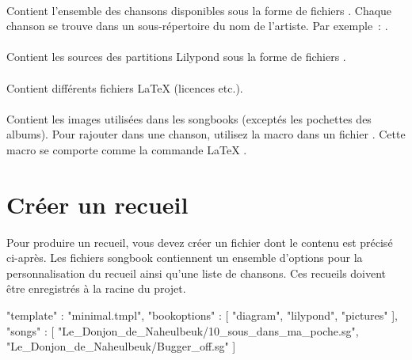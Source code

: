\paragraph{}
Contient l'ensemble des chansons disponibles sous la forme de fichiers
. Chaque chanson se trouve dans un sous-répertoire du nom
de l'artiste. Par exemple~:
.

\paragraph{}
Contient les sources des partitions Lilypond sous la forme de fichiers
.

\paragraph{}
Contient différents fichiers \LaTeX{} (licences etc.).

\paragraph{}
Contient les images utilisées dans les songbooks (exceptés les
pochettes des albums). Pour rajouter  dans une
chanson, utilisez la macro  dans un fichier
. Cette macro se comporte comme la commande \LaTeX{}
.

\begin{songbook}
\end{songbook}

\section{Créer un recueil}
\label{sec:create-songbook}

Pour produire un recueil, vous devez créer un fichier 
dont le contenu est précisé ci-après. Les fichiers songbook
 contiennent un ensemble d'options pour la
personnalisation du recueil ainsi qu'une liste de chansons.
Ces recueils doivent être enregistrés à la racine du projet.

\begin{code}
{
"template" : "minimal.tmpl",
"bookoptions" : [
    "diagram",
    "lilypond",
    "pictures"
  ],
"songs" : [
    "Le_Donjon_de_Naheulbeuk/10_sous_dans_ma_poche.sg",
    "Le_Donjon_de_Naheulbeuk/Bugger_off.sg"
  ]
}
\end{code}

